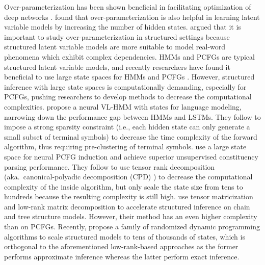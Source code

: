 \documentclass[11pt]{article}
\begin{document}
Over-parameterization has been shown beneficial in facilitating optimization of deep networks \cite{DBLP:conf/icml/AroraCH18, DBLP:conf/nips/XuHM18, DBLP:conf/iclr/DuZPS19}. \citet{DBLP:conf/icml/BuhaiHKRS20} found that over-parameterization is also helpful in learning latent variable models by increasing the number of hidden states. \citet{DBLP:conf/icml/BuhaiHKRS20} argued that it is important to study over-parameterization in structured settings because structured latent variable models are more suitable to model real-word phenomena which exhibit complex dependencies. HMMs and PCFGs are typical structured latent variable models, and recently researchers have found it beneficial to use large state spaces for HMMs and PCFGs \cite{DBLP:journals/corr/abs-1905-00507, chiu-rush-2020-scaling, yang-etal-2021-pcfgs, chiu2021low}.
However, structured inference with large state spaces is computationally demanding, especially for PCFGs, pushing researchers to develop methods to decrease the computational complexities. 
\citet{chiu-rush-2020-scaling} propose a neural VL-HMM with  states for language modeling, narrowing down the performance gap between HMMs and LSTMs. 
  They follow \citet{DBLP:journals/corr/abs-1905-00507} to impose a strong sparsity constraint (i.e., each hidden state can only generate a small subset of terminal symbols) to decrease the time complexity of the forward algorithm, thus requiring pre-clustering of terminal symbols.
\citet{yang-etal-2021-pcfgs} use a large state space for neural PCFG induction and achieve superior unsupervised constituency parsing performance. They follow \citet{cohen-etal-2013-approximate} to use tensor rank decomposition (aka.\ canonical-polyadic decomposition (CPD) \cite{DBLP:journals/corr/abs-1711-10781}) to decrease the computational complexity of the inside algorithm, but only scale the state size from tens to hundreds because the resulting complexity is still high. \citet{chiu2021low} use tensor matricization and low-rank matrix decomposition to accelerate structured inference on chain and tree structure models. However, their method has an even higher complexity than \citet{yang-etal-2021-pcfgs} on PCFGs. Recently, \citet{fu2021scaling} propose a family of randomized dynamic programming algorithms to scale structured models to tens of thousands of states, which is orthogonal to the aforementioned low-rank-based approaches as the former performs approximate inference whereas the latter perform exact inference. 
\end{document}
